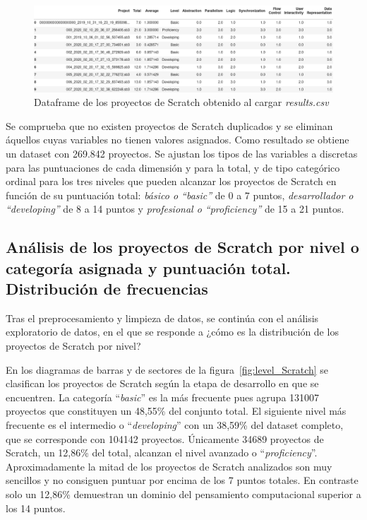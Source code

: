 \documentclass[a4paper, 12pt]{book}
\begin{document}
\begin{figure}[H]
    \centering
    \includegraphics[width=1.0\textwidth]{img/df_origen_Scratch.png}
    \caption{Dataframe de los proyectos de Scratch obtenido al cargar \emph{results.csv}}\label{fig:df_Scratch}
\end{figure}

Se comprueba que no existen proyectos de Scratch duplicados y se eliminan áquellos cuyas variables no tienen valores asignados. Como resultado se obtiene un dataset con 269.842 proyectos. Se ajustan los tipos de las variables a discretas para las puntuaciones de cada dimensión y para la total, y de tipo categórico ordinal para los tres niveles que pueden alcanzar los proyectos de Scratch en función de su puntuación total: \emph{ básico o ``basic''} de 0 a 7 puntos, \emph{desarrollador o ``developing''} de 8 a 14 puntos y \emph{profesional o ``proficiency''} de 15 a 21 puntos. 

\subsection{Análisis de los proyectos de Scratch por nivel o categoría asignada y puntuación total. Distribución de frecuencias}
\label{subsec:frec_nivel}

Tras el preprocesamiento y limpieza de datos, se continúa con el análisis exploratorio de datos, en el que se responde a ¿cómo es la distribución de los proyectos de Scratch por nivel? 

En los diagramas de barras y de sectores de la figura~\ref{fig:level_Scratch} se clasifican los proyectos de Scratch según la etapa de desarrollo en que se encuentren. La categoría ``\emph{basic}'' es la más frecuente pues agrupa 131007 proyectos que constituyen un 48,55\% del conjunto total. El siguiente nivel más frecuente es el intermedio o ``\emph{developing}'' con un 38,59\% del dataset completo, que se corresponde con 104142 proyectos. Únicamente 34689 proyectos de Scratch, un 12,86\% del total, alcanzan el nivel avanzado o ``\emph{proficiency}''. Aproximadamente la mitad de los proyectos de Scratch analizados son muy sencillos y no consiguen puntuar por encima de los 7 puntos totales. En contraste solo un 12,86\% demuestran un dominio del pensamiento computacional superior a los 14 puntos.
\end{document}
